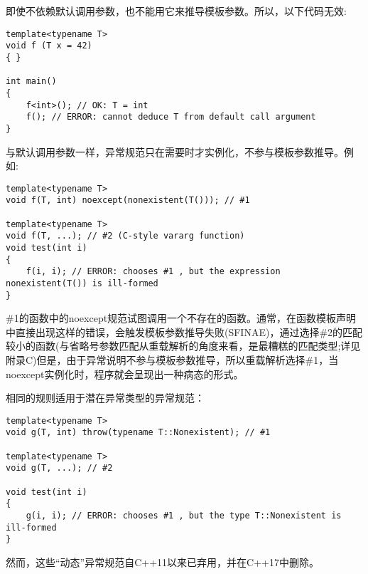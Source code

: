 即使不依赖默认调用参数，也不能用它来推导模板参数。所以，以下代码无效:

\begin{lstlisting}[style=styleCXX]
template<typename T>
void f (T x = 42)
{ }

int main()
{
	f<int>(); // OK: T = int
	f(); // ERROR: cannot deduce T from default call argument
}
\end{lstlisting}


与默认调用参数一样，异常规范只在需要时才实例化，不参与模板参数推导。例如:

\begin{lstlisting}[style=styleCXX]
template<typename T>
void f(T, int) noexcept(nonexistent(T())); // #1

template<typename T>
void f(T, ...); // #2 (C-style vararg function)
void test(int i)
{
	f(i, i); // ERROR: chooses #1 , but the expression nonexistent(T()) is ill-formed
}
\end{lstlisting}

\#1的函数中的noexcept规范试图调用一个不存在的函数。通常，在函数模板声明中直接出现这样的错误，会触发模板参数推导失败(SFINAE)，通过选择\#2的匹配较小的函数(与省略号参数匹配从重载解析的角度来看，是最糟糕的匹配类型;详见附录C)但是，由于异常说明不参与模板参数推导，所以重载解析选择\#1，当noexcept实例化时，程序就会呈现出一种病态的形式。

相同的规则适用于潜在异常类型的异常规范：

\begin{lstlisting}[style=styleCXX]
template<typename T>
void g(T, int) throw(typename T::Nonexistent); // #1

template<typename T>
void g(T, ...); // #2

void test(int i)
{
	g(i, i); // ERROR: chooses #1 , but the type T::Nonexistent is ill-formed
}
\end{lstlisting}

然而，这些“动态”异常规范自C++11以来已弃用，并在C++17中删除。



















